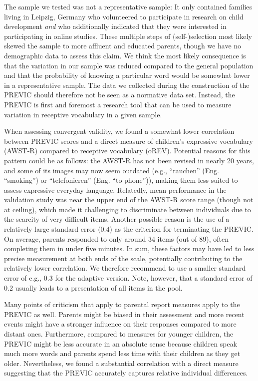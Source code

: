 \documentclass[
  man,floatsintext]{apa6}
\begin{document}
The sample we tested was not a representative sample: It only contained families living in Leipzig, Germany who volunteered to participate in research on child development \emph{and} who additionally indicated that they were interested in participating in online studies. These multiple steps of (self-)selection most likely skewed the sample to more affluent and educated parents, though we have no demographic data to assess this claim. We think the most likely consequence is that the variation in our sample was reduced compared to the general population and that the probability of knowing a particular word would be somewhat lower in a representative sample. The data we collected during the construction of the PREVIC should therefore not be seen as a normative data set. Instead, the PREVIC is first and foremost a research tool that can be used to measure variation in receptive vocabulary in a given sample.

When assessing convergent validity, we found a somewhat lower correlation between PREVIC scores and a direct measure of children's expressive vocabulary (AWST-R) compared to receptive vocabulary (oREV). Potential reasons for this pattern could be as follows: the AWST-R has not been revised in nearly 20 years, and some of its images may now seem outdated (e.g., ``rauchen'' (Eng. ``smoking'') or ``telefonieren'' (Eng. ``to phone'')), making them less suited to assess expressive everyday language. Relatedly, mean performance in the validation study was near the upper end of the AWST-R score range (though not at ceiling), which made it challenging to discriminate between individuals due to the scarcity of very difficult items. Another possible reason is the use of a relatively large standard error (0.4) as the criterion for terminating the PREVIC. On average, parents responded to only around 34 items (out of 89), often completing them in under five minutes. In sum, these factors may have led to less precise measurement at both ends of the scale, potentially contributing to the relatively lower correlation. We therefore recommend to use a smaller standard error of e.g., 0.3 for the adaptive version. Note, however, that a standard error of 0.2 usually leads to a presentation of all items in the pool.

Many points of criticism that apply to parental report measures apply to the PREVIC as well. Parents might be biased in their assessment and more recent events might have a stronger influence on their responses compared to more distant ones. Furthermore, compared to measures for younger children, the PREVIC might be less accurate in an absolute sense because children speak much more words and parents spend less time with their children as they get older. Nevertheless, we found a substantial correlation with a direct measure suggesting that the PREVIC accurately captures relative individual differences.
\end{document}
